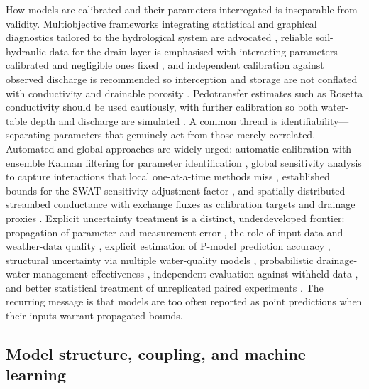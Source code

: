 How models are calibrated and their parameters interrogated is inseparable from
validity. Multiobjective frameworks integrating statistical and graphical
diagnostics tailored to the hydrological system are advocated
\parencite{Bruhn2025}, reliable soil-hydraulic data for the drain layer is
emphasised with interacting parameters calibrated and negligible ones fixed
\parencite{Wang2006}, and independent calibration against observed discharge is
recommended so interception and storage are not conflated with conductivity and
drainable porosity \parencite{Henine2022}. Pedotransfer estimates such as
Rosetta conductivity should be used cautiously, with further calibration so both
water-table depth and discharge are simulated \parencite{Malota2022,Timalsina2023}.
A common thread is identifiability---separating parameters that genuinely act
from those merely correlated. Automated and global approaches are widely urged:
automatic calibration with ensemble Kalman filtering for parameter identification
\parencite{Warsta2014,Sadhukhan2019b,Singh2019b}, global sensitivity analysis to
capture interactions that local one-at-a-time methods miss
\parencite{Timalsina2023,Chelil2022,Kacimov2000}, established bounds for the
SWAT sensitivity adjustment factor \parencite{Moriasi2013b}, and spatially
distributed streambed conductance with exchange fluxes as calibration targets and
drainage proxies \parencite{Karan2021}. Explicit uncertainty treatment is a
distinct, underdeveloped frontier: propagation of parameter and measurement error
\parencite{Alzraiee2013b}, the role of input-data and weather-data quality
\parencite{Upadhyay2019,Tao2021}, explicit estimation of P-model prediction
accuracy \parencite{Radcliffe2015,Beauchemin2003}, structural uncertainty via
multiple water-quality models \parencite{Kujawa2020}, probabilistic
drainage-water-management effectiveness \parencite{Shedekar2021}, independent
evaluation against withheld data \parencite{Schoups2005}, and better statistical
treatment of unreplicated paired experiments \parencite{Pagliari2021,Andrus2014}.
The recurring message is that models are too often reported as point predictions
when their inputs warrant propagated bounds.

\subsection{Model structure, coupling, and machine learning}

